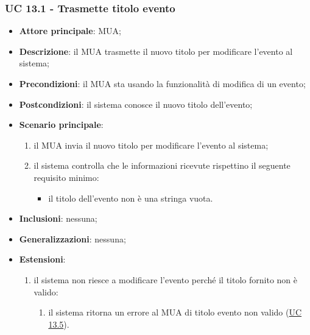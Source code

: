 \subsubsection{UC 13.1 - Trasmette titolo evento} \label{sec:UC13.1}
    \begin{itemize}
        \item \textbf{Attore principale}: MUA;
        \item \textbf{Descrizione}: il MUA trasmette il nuovo titolo per modificare l'evento al sistema;
        \item \textbf{Precondizioni}: il MUA sta usando la funzionalità di modifica di un evento;
        \item \textbf{Postcondizioni}: il sistema conosce il nuovo titolo dell'evento;
        \item \textbf{Scenario principale}:
            \begin{enumerate}
                \item il MUA invia il nuovo titolo per modificare l'evento al sistema;
                \item il sistema controlla che le informazioni ricevute rispettino il seguente requisito minimo:
                    \begin{itemize}
                        \item il titolo dell'evento non è una stringa vuota.
                    \end{itemize}
            \end{enumerate}
        \item \textbf{Inclusioni}: nessuna;
        \item \textbf{Generalizzazioni}: nessuna;
        \item \textbf{Estensioni}:
            \begin{enumerate}[label=\alph*.]
                \item il sistema non riesce a modificare l'evento perché il titolo fornito non è valido:
                \begin{enumerate}[label=\arabic*.]
                    \item il sistema ritorna un errore al MUA di titolo evento non valido (\hyperref[sec:UC13.5]{UC 13.5}).
                \end{enumerate}
            \end{enumerate}
    \end{itemize}



